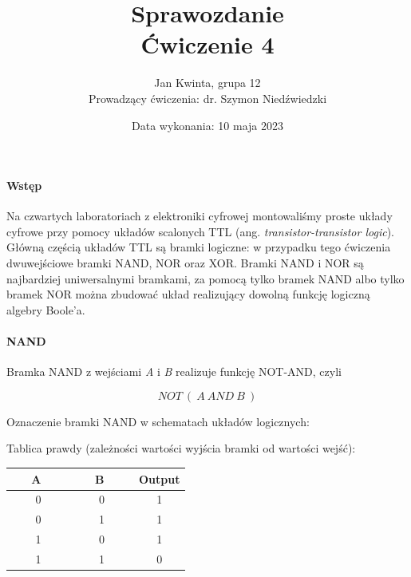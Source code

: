 \documentclass[14pt, table]{extarticle}
\title{\textbf{Sprawozdanie} \\ \Large{Ćwiczenie 4}}
\date{Data wykonania: 10 maja 2023}
\author{ \Large{Jan Kwinta, grupa 12} \\ \large{Prowadzący ćwiczenia: dr. Szymon Niedźwiedzki}}
\newcommand{\nl}{\vspace{0.5cm}}
\begin{document}
\maketitle

\paragraph{Wstęp \\}
Na czwartych laboratoriach z elektroniki cyfrowej montowaliśmy proste układy cyfrowe przy pomocy układów scalonych TTL (ang. \textit{transistor-transistor logic}). Główną częścią układów TTL są bramki logiczne: w przypadku tego ćwiczenia dwuwejściowe bramki NAND, NOR oraz XOR. Bramki NAND i NOR są najbardziej uniwersalnymi bramkami, za pomocą tylko bramek NAND albo tylko bramek NOR można zbudować układ realizujący dowolną funkcję logiczną algebry Boole'a. \\

\paragraph{NAND \\}
Bramka NAND z wejściami \textit{A} i \textit{B} realizuje funkcję NOT-AND, czyli 

$$ NOT \ ( \ \textit{A} \ AND \ \textit{B} \ ) $$

\nl
Oznaczenie bramki NAND w schematach układów logicznych:
\begin{center}
\end{center}

\nl
Tablica prawdy (zależności wartości wyjścia bramki od wartości wejść):

{
\centering
\begin{center}
\begin{tabular}{ | c | c | c | } 
  \hline
  \ \ \ \textbf{A} \ \ \ & \ \ \ \textbf{B} \ \ \ & \textbf{Output} \\ 
  \hline
  0 & 0 & 1 \\
  \hline
  0 & 1 & 1 \\
  \hline
  1 & 0 & 1 \\
  \hline
  1 & 1 & 0 \\
  \hline
\end{tabular}
\end{center}
}
\end{document}
